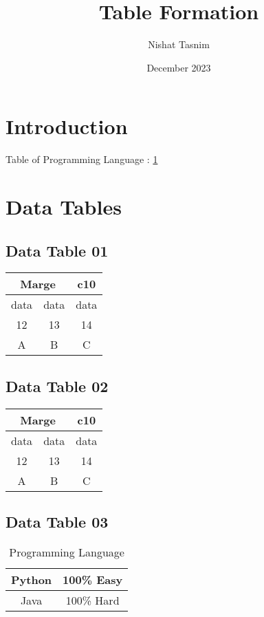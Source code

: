 \documentclass{article}
\title{Table Formation}
\author{Nishat Tasnim}
\date{December 2023}
\begin{document}
\maketitle

\tableofcontents
\listoftables

\section{Introduction}
Table of Programming Language : \ref{tab:PyJava}

\section{Data Tables}
\subsection{Data Table 01}
\begin{center}
    \begin{tabular}{| c | c | c |}
        \hline
        \multicolumn{2}{|c|}{Marge} & c10\\
        \hline
        \hline
        data & data & data  \\
        \hline
        12 & 13 & 14\\
        \hline
        A & B & C\\
        \hline
    \end{tabular}
\end{center}

\subsection{Data Table 02}
\begin{center}
    \begin{tabular}{| c | c | c |}
        \hline
        \multicolumn{2}{|c|}{Marge} & c10\\
        \hline
        \hline
        \rowcolor{yellow}
        data & data & data  \\
        \hline
        \rowcolor{green}
        12 & 13 & 14\\
        \hline
        \rowcolor{red}
        A & B & C\\
        \hline
    \end{tabular}
\end{center}

\subsection{Data Table 03}
\begin{table}[h]
    \centering
    \begin{tabular}{|c|c|}
        \hline
        Python &  100\% Easy\\
        \hline
        Java & 100\% Hard\\
        \hline
    \end{tabular}
    \caption{Programming Language}
    \label{tab:PyJava}
\end{table}
\end{document}
